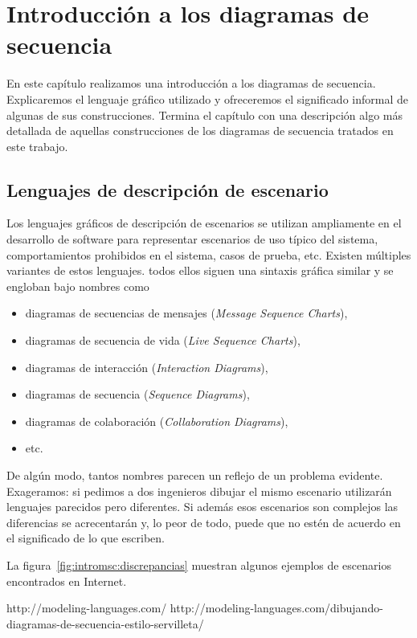 \chapter{Introducción a los diagramas de secuencia}
\label{ch:msc}

En este capítulo realizamos una introducción a los diagramas de
secuencia. Explicaremos el lenguaje gráfico utilizado y ofreceremos el
significado informal de algunas de sus construcciones. Termina el
capítulo con una descripción algo más detallada de aquellas
construcciones de los diagramas de secuencia tratados en este trabajo.

\section{Lenguajes de descripción de escenario}
Los lenguajes gráficos de descripción de escenarios se utilizan
ampliamente en el desarrollo de software para representar escenarios
de uso típico del sistema, comportamientos prohibidos en el sistema,
casos de prueba, etc. Existen múltiples variantes de estos lenguajes.
todos ellos siguen una sintaxis gráfica similar y se engloban bajo
nombres como
\begin{itemize}
\item diagramas de secuencias de mensajes (\emph{Message Sequence Charts}),
\item diagramas de secuencia de vida (\emph{Live Sequence Charts}),
\item diagramas de interacción (\emph{Interaction Diagrams}),
\item diagramas de secuencia (\emph{Sequence Diagrams}),
\item diagramas de colaboración (\emph{Collaboration Diagrams}),
\item etc.
\end{itemize}

De algún modo, tantos nombres parecen un reflejo de un problema
evidente. Exageramos: si pedimos a dos ingenieros dibujar el mismo
escenario utilizarán lenguajes parecidos pero diferentes. Si además
esos escenarios son complejos las diferencias se acrecentarán y, lo
peor de todo, puede que no estén de acuerdo en el significado de lo
que escriben.

La figura~\ref{fig:intromsc:discrepancias} muestran algunos ejemplos
de escenarios encontrados en Internet.

http://modeling-languages.com/
http://modeling-languages.com/dibujando-diagramas-de-secuencia-estilo-servilleta/

